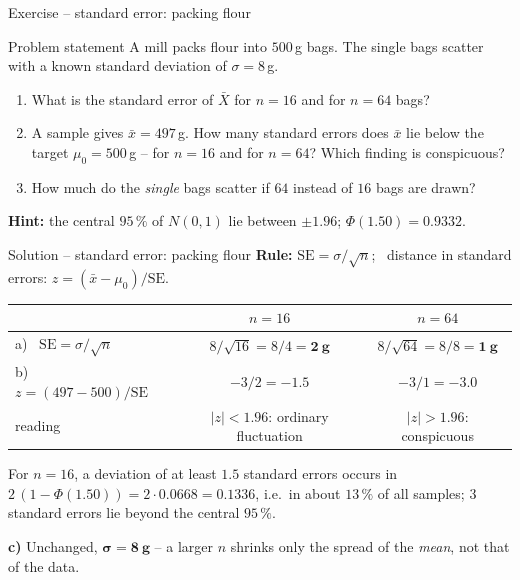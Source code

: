 \documentclass[aspectratio=169,11pt]{beamer}
\begin{document}
\begin{frame}{Exercise -- standard error: packing flour}
  \begin{block}{Problem statement}
    A mill packs flour into $500$\,g bags. The single bags scatter with a
    known standard deviation of $\sigma=8$\,g.
  \end{block}
  \begin{enumerate}\setlength{\itemsep}{4pt}
    \item[a)] What is the standard error of $\bar X$ for $n=16$ and for
              $n=64$ bags?
    \item[b)] A sample gives $\bar x=497$\,g. How many standard errors does
              $\bar x$ lie below the target $\mu_0=500$\,g -- for $n=16$ and
              for $n=64$? Which finding is conspicuous?
    \item[c)] How much do the \emph{single} bags scatter if $64$ instead of
              $16$ bags are drawn?
  \end{enumerate}
  \textbf{Hint:} the central $95\,\%$ of $N(0,1)$ lie between $\pm1.96$;
  $\Phi(1.50)=0.9332$.
\end{frame}

\begin{frame}{Solution -- standard error: packing flour}
  \textbf{Rule:} $\mathrm{SE}=\sigma/\sqrt n$; \ distance in standard errors:
  $z=(\bar x-\mu_0)/\mathrm{SE}$.
  \begin{center}
    \renewcommand{\arraystretch}{1.3}
    \begin{tabular}{lcc}
      \toprule
       & $n=16$ & $n=64$\\
      \midrule
      a) \ $\mathrm{SE}=\sigma/\sqrt n$
        & $8/\sqrt{16}=8/4=\mathbf{2\ g}$
        & $8/\sqrt{64}=8/8=\mathbf{1\ g}$\\
      b) \ $z=(497-500)/\mathrm{SE}$
        & $-3/2=\mathbf{-1.5}$
        & $-3/1=\mathbf{-3.0}$\\
      \phantom{b) \ }reading
        & $|z|<1.96$: ordinary fluctuation
        & \textcolor{hsbirot}{$|z|>1.96$: conspicuous}\\
      \bottomrule
    \end{tabular}
  \end{center}
  {\small For $n=16$, a deviation of at least $1.5$ standard errors occurs in
  $2\,(1-\Phi(1.50))=2\cdot0.0668=0.1336$, i.e.\ in about $13\,\%$ of all
  samples; $3$ standard errors lie beyond the central $95\,\%$.\par}
  \smallskip
  \textbf{c)} Unchanged, $\mathbf{\sigma=8\ g}$ -- a larger $n$ shrinks only
  the spread of the \emph{mean}, not that of the data.
\end{frame}
\end{document}
